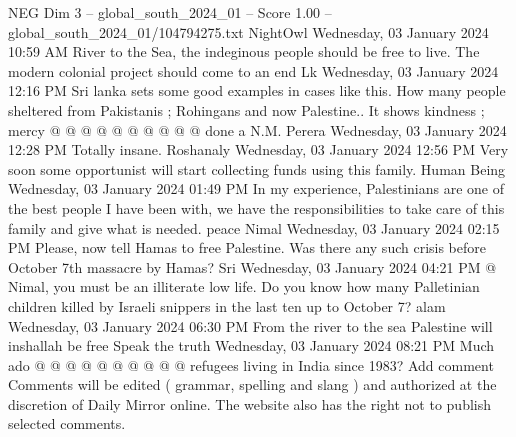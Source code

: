 \begin{textsample}{NEG Dim 3 – global\_south\_2024\_01 – Score 1.00 – global\_south\_2024\_01/104794275.txt}
NightOwl Wednesday, 03 January 2024 10:59 AM River to the Sea, the indeginous people should be free to live.
The modern colonial project should come to an end Lk Wednesday, 03 January 2024 12:16 PM Sri lanka sets some good examples in cases like this.
How many people sheltered from Pakistanis ; Rohingans and now Palestine..
It shows kindness ; mercy @ @ @ @ @ @ @ @ @ @ done a N.M.
Perera Wednesday, 03 January 2024 12:28 PM Totally insane.
Roshanaly Wednesday, 03 January 2024 12:56 PM Very soon some opportunist will start collecting funds using this family.
Human Being Wednesday, 03 January 2024 01:49 PM In my experience, Palestinians are one of the best people I have been with, we have the responsibilities to take care of this family and give what is needed. peace Nimal Wednesday, 03 January 2024 02:15 PM Please, now tell Hamas to free Palestine.
Was there any such crisis before October 7th massacre by Hamas?
Sri Wednesday, 03 January 2024 04:21 PM @ Nimal, you must be an illiterate low life.
Do you know how many Palletinian children killed by Israeli snippers in the last ten up to October 7? alam Wednesday, 03 January 2024 06:30 PM From the river to the sea Palestine will inshallah be free Speak the truth Wednesday, 03 January 2024 08:21 PM Much ado @ @ @ @ @ @ @ @ @ @ refugees living in India since 1983?
Add comment Comments will be edited ( grammar, spelling and slang ) and authorized at the discretion of Daily Mirror online.
The website also has the right not to publish selected comments.

\end{textsample}
